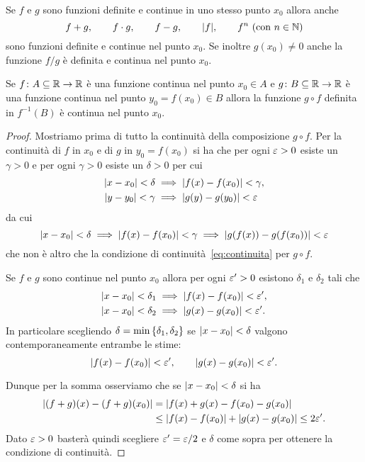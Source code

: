   \begin{theorem}
  \label{th:continuita_composizione}%
  Se $f$ e $g$ sono funzioni definite e continue
  in uno stesso punto $x_0$
  allora anche
  \[
    f+g, \qquad
    f\cdot g, \qquad
    f-g, \qquad
    {\left|f\right|}, \qquad
    f^n\ \text{(con $n\in {\mathbb N}$)}
  \]
  sono funzioni definite e continue nel punto $x_0$.
  Se inoltre $g(x_0)\neq 0$ anche la funzione
  $f/g$
  è definita e continua nel punto $x_0$.
  
  Se $f\colon A\subseteq {\mathbb R} \to {\mathbb R}$ è una funzione continua
  nel punto $x_0\in A$ e
  $g\colon B\subseteq {\mathbb R} \to {\mathbb R}$ è una funzione
  continua nel punto $y_0=f(x_0)\in B$ allora la funzione $g\circ f$
  definita in $f^{-1}(B)$ è continua nel punto $x_0$.
  \end{theorem}
  \begin{proof}
  Mostriamo prima di tutto la continuità
  della composizione $g\circ f$.
  Per la continuità di $f$ in $x_0$ e di $g$ in $y_0=f(x_0)$
  si ha che per ogni $\varepsilon>0$ esiste un $\gamma>0$
  e per ogni $\gamma>0$ esiste un $\delta>0$ per cui
  \begin{align*}
   {\left|x-x_0\right|}< \delta &\implies {\left|f(x)-f(x_0)\right|}<\gamma,\\
   {\left|y-y_0\right|}< \gamma & \implies {\left|g(y)-g(y_0)\right|}<\varepsilon
  \end{align*}
  da cui
  \[
  {\left|x-x_0\right|}< \delta
  \implies {\left|f(x)-f(x_0)\right|}< \gamma
  \implies {\left|g(f(x))-g(f(x_0))\right|} < \varepsilon
  \]
  che non è altro che la condizione di
  continuità~\eqref{eq:continuita} per $g\circ f$.
  
  Se $f$ e $g$ sono continue nel punto $x_0$
  allora per ogni $\varepsilon'>0$ esistono $\delta_1$
  e $\delta_2$ tali che
  \begin{align*}
   {\left|x-x_0\right|} < \delta_1 &\implies {\left|f(x)-f(x_0)\right|} < \varepsilon',
   \\
   {\left|x-x_0\right|} < \delta_2 &\implies {\left|g(x)-g(x_0)\right|} < \varepsilon'.
  \end{align*}
  In particolare scegliendo $\delta = \min{\left\{ \delta_1,\delta_2 \right\}}$
  se ${\left|x-x_0\right|} < \delta$ valgono contemporaneamente
  entrambe le stime:
  \[
   {\left|f(x)-f(x_0)\right|}< \varepsilon', \qquad
   {\left|g(x)-g(x_0)\right|}< \varepsilon'.
  \]
  
  Dunque per la somma osserviamo che se ${\left|x-x_0\right|}<\delta$
  si ha
  \begin{align*}
   {\left|(f+g)(x) - (f+g)(x_0)\right|}
    &= {\left|f(x)+g(x)-f(x_0)-g(x_0)\right|}\\
    &\le {\left|f(x)-f(x_0)\right|} + {\left|g(x)-g(x_0)\right|}
    \le 2 \varepsilon'.
  \end{align*}
  Dato $\varepsilon>0$ basterà quindi scegliere $\varepsilon' = \varepsilon / 2$
  e $\delta$ come sopra per ottenere la condizione di continuità.
  

\end{proof}
